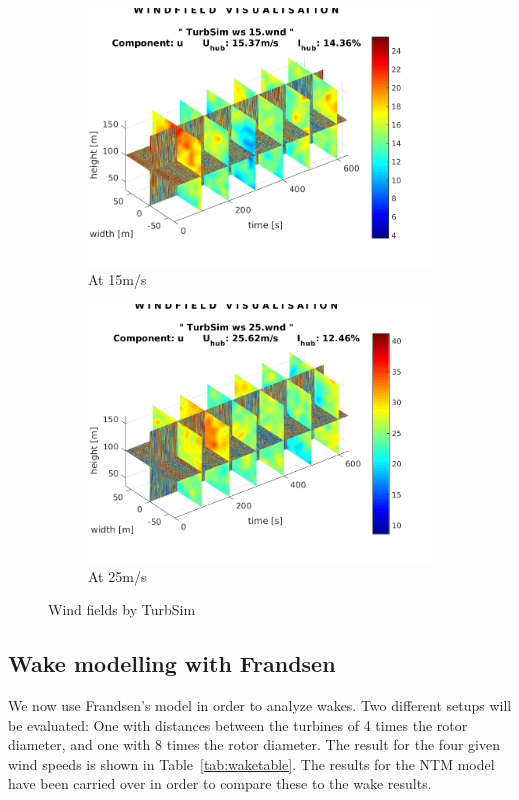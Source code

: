 \documentclass[10pt]{article}
\begin{document}
\begin{figure}[htb!]
\begin{subfigure}{0.4\textwidth}
  \includegraphics[width=1\linewidth]{../CIP_5/CIP_Tutorial_5_-_Windfield_and_wake_simulation/TurbSim/wind_15ms.png}
   \caption{At 15m/s}
\end{subfigure}
\begin{subfigure}{0.4\textwidth}
  \centering
  \includegraphics[width=1\linewidth]{../CIP_5/CIP_Tutorial_5_-_Windfield_and_wake_simulation/TurbSim/wind_25ms.png}
   \caption{At 25m/s}
\end{subfigure}
\caption{Wind fields by TurbSim}
\label{fig:windfields}
\end{figure}


\subsection{Wake modelling with Frandsen}
We now use Frandsen's model in order to analyze wakes. Two different setups will be evaluated: One with distances between the turbines of 4 times the rotor diameter, and one with 8 times the rotor diameter.
The result for the four given wind speeds is shown in Table~\ref{tab:waketable}. The results for the NTM model have been carried over in order to compare these to the wake results.
    
\end{document}
